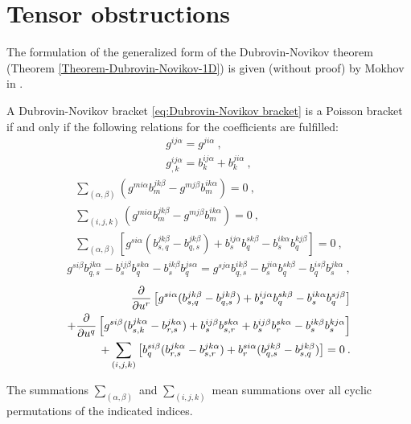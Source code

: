 \section{Tensor obstructions}

The formulation of the generalized form of the Dubrovin-Novikov theorem (Theorem \vref{Theorem-Dubrovin-Novikov-1D}) is given (without proof) by Mokhov in \cite{Mochov}.

\begin{theorem}
    A Dubrovin-Novikov bracket \eqref{eq:Dubrovin-Novikov bracket} is a Poisson bracket if and only if the following relations for the coefficients are fulfilled:
    \begin{align}
        g^{ij \alpha} = g^{ji \alpha} \:, \label{eq:Mochov-A} \\
        g^{ij \alpha}_{,k} = b^{ij \alpha}_k + b^{ji \alpha}_k \:, \label{eq:Mochov-B}
    \end{align}
    \begin{align}
        \sum_{(\alpha, \beta)} (g^{mi \alpha} b^{jk \beta}_m - g^{m j \beta} b^{i k \alpha}_m) = 0 \:, \label{eq:Mochov-C}\\
        \sum_{(i,j,k)} (g^{mi \alpha} b^{jk \beta}_m - g^{m j \beta} b^{ik \alpha}_m) = 0 \:, \label{eq:Mochov-D}\\
        \sum_{(\alpha, \beta)} \left[ g^{si \alpha} (b^{jk \beta}_{s,q} - b^{jk \beta}_{q,s} ) + b^{ij \alpha}_s b^{s k \beta}_q - b^{i k \alpha}_s b^{k j \beta}_q \right] = 0 \label{eq:Mochov-E}\:,
    \end{align}
    \begin{align}
        g^{si \beta} b^{j k \alpha}_{q,s} - b^{ij \beta}_s b^{s k \alpha}_q - b^{i k \beta}_s b^{j s \alpha}_q = g^{s j \alpha} b^{i k \beta}_{q,s} - b^{ji \alpha}_s b^{s k \beta}_q - b^{is \beta}_q b^{jk \alpha}_s \label{eq:Mochov-F}\:,
    \end{align}
    \begin{align}
        \frac{\partial }{\partial u^r} \left[ g^{si \alpha} (b^{j k \beta}_{s,q} - b^{j k \beta}_{q,s}) + b^{ij \alpha}_s b^{s k \beta}_q - b^{i k \alpha}_s b^{s j \beta}_q \right] 
        \nonumber \\+ \frac{\partial }{\partial u^q} \left[ g^{si \beta} (b^{j k  \alpha}_{s,k} - b^{j k \alpha}_{r,s}) + b^{ij \beta}_s b^{s k \alpha}_{s,r} + b^{ij \beta}_s b^{s k \alpha}_r - b^{i k \beta}_s b^{k j \alpha}_s \right] \label{eq:Mochov-G}
        \\+ \sum_{(i,j,k)} \left[ b^{si \beta}_q (b^{j k \alpha}_{r,s} - b^{j k \alpha}_{s,r}) + b^{s i \alpha}_r (b^{j k \beta}_{q,s} - b^{j k \beta}_{s,q}) \right] \nonumber
        = 0 \:.
    \end{align}
\end{theorem}
The summations $\sum_{(\alpha, \beta)}$ and $\sum_{(i,j,k)}$ mean summations over all cyclic permutations of the indicated indices.

